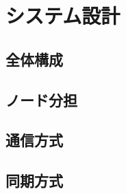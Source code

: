 \chapter{システム設計}
\label{ch:system_design}

\section{全体構成}

\section{ノード分担}

\section{通信方式}

\section{同期方式}
